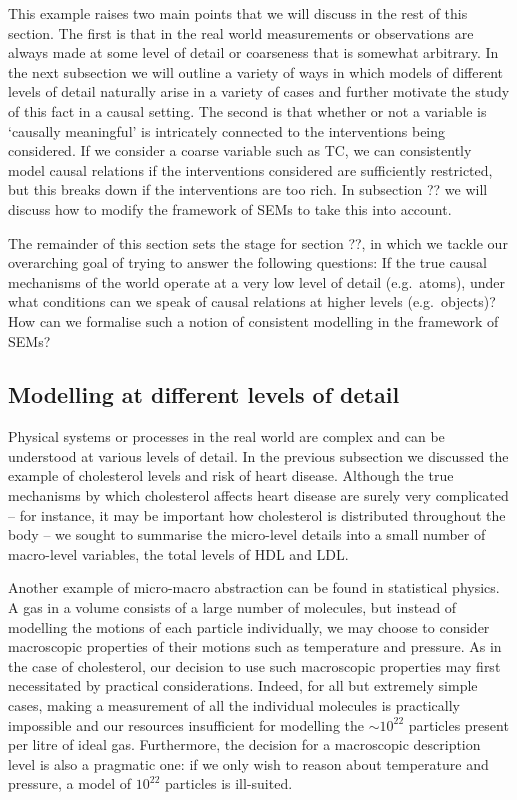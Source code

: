 This example raises two main points that we will discuss in the rest of this section. The first is that in the real world measurements or observations are always made at some level of detail or coarseness that is somewhat arbitrary. In the next subsection we will outline a variety of ways in which models of different levels of detail naturally arise in a variety of cases and further motivate the study of this fact in a causal setting.
The second is that whether or not a variable is `causally meaningful' is intricately connected to the interventions being considered. If we consider a coarse variable such as TC, we can consistently model causal relations if the interventions considered are sufficiently restricted, but this breaks down if the interventions are too rich. In subsection ?? we will discuss how to modify the framework of SEMs to take this into account.

The remainder of this section sets the stage for section ??, in which we tackle our overarching goal of trying to answer the following questions:
If the true causal mechanisms of the world operate at a very low level of detail (e.g.~atoms), under what conditions can we speak of causal relations at higher levels (e.g.~objects)?
How can we formalise such a notion of consistent modelling in the framework of SEMs?


\subsection{Modelling at different levels of detail}

Physical systems or processes in the real world are complex and can be understood at various levels of detail.
In the previous subsection we discussed the example of cholesterol levels and risk of heart disease.
Although the true mechanisms by which cholesterol affects heart disease are surely very complicated -- for instance, it may be important how cholesterol is distributed throughout the body -- we sought to summarise the micro-level details into a small number of macro-level variables, the total levels of HDL and LDL.

Another example of micro-macro abstraction 
can be found in statistical physics.
A gas in a volume consists of a large number of molecules, but instead of modelling the motions of each particle individually, we may choose to consider macroscopic properties of their motions such as temperature and pressure.
As in the case of cholesterol, our decision to use such macroscopic properties may first necessitated by practical considerations.
Indeed, for all but extremely simple cases, making a measurement of all the individual molecules is practically impossible and our resources insufficient for modelling the ${\sim}10^{22}$ particles present per litre of ideal gas.
Furthermore, the decision for a macroscopic description level is also a pragmatic one: if we only wish to reason about temperature and pressure, a model of $10^{22}$ particles is ill-suited.

